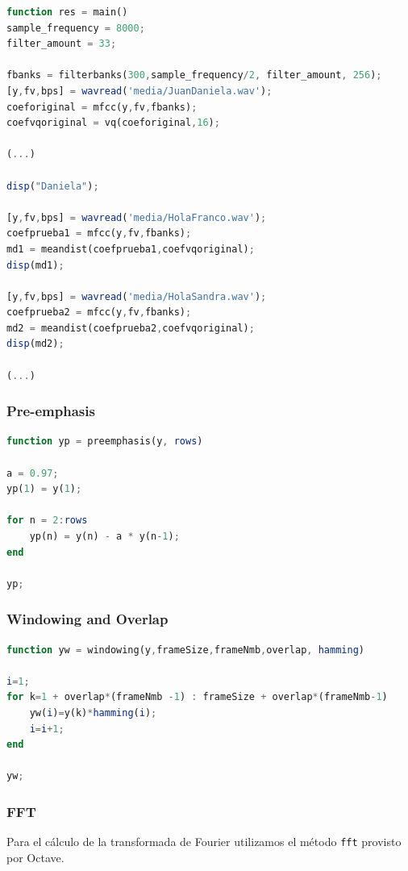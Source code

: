 \documentclass[a4paper,10pt]{article}
\begin{document}
\begin{lstlisting}[language=Octave, caption = main.m]
function res = main()
sample_frequency = 8000;
filter_amount = 33;

fbanks = filterbanks(300,sample_frequency/2, filter_amount, 256);
[y,fv,bps] = wavread('media/JuanDaniela.wav');
coeforiginal = mfcc(y,fv,fbanks);
coefvqoriginal = vq(coeforiginal,16);

(...)

disp("Daniela");

[y,fv,bps] = wavread('media/HolaFranco.wav');
coefprueba1 = mfcc(y,fv,fbanks);
md1 = meandist(coefprueba1,coefvqoriginal);
disp(md1);

[y,fv,bps] = wavread('media/HolaSandra.wav');
coefprueba2 = mfcc(y,fv,fbanks);
md2 = meandist(coefprueba2,coefvqoriginal);
disp(md2);

(...)
\end{lstlisting}

\subsubsection{Pre-emphasis}

\begin{lstlisting}[language=Octave, caption = Pre-emphasis]
function yp = preemphasis(y, rows)

a = 0.97;
yp(1) = y(1);

for n = 2:rows
	yp(n) = y(n) - a * y(n-1);
end

yp;
\end{lstlisting}

\subsubsection{Windowing and Overlap}

\begin{lstlisting}[language=Octave, caption = Windowing]
function yw = windowing(y,frameSize,frameNmb,overlap, hamming)

i=1;
for k=1 + overlap*(frameNmb -1) : frameSize + overlap*(frameNmb-1)
	yw(i)=y(k)*hamming(i);
	i=i+1;
end

yw;
\end{lstlisting}

\subsubsection{FFT}

	Para el cálculo de la transformada de Fourier utilizamos el método \texttt{fft} provisto por Octave.
\end{document}
